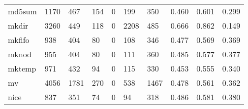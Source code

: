 \begin{longtable}{lp{2.0cm}p{2.0cm}p{2.0cm}p{2.0cm}p{2.0cm}p{2.0cm}p{2.0cm}p{2.0cm}p{2.0cm}}
md5sum    &                   1170 &                                467 &                               154 &                                0 &                               199 &                             350 &                                   0.460 &                                  0.601 &                                0.299 \\
mkdir     &                   3260 &                                449 &                               118 &                                0 &                              2208 &                             485 &                                   0.666 &                                  0.862 &                                0.149 \\
mkfifo    &                    938 &                                404 &                                80 &                                0 &                               108 &                             346 &                                   0.477 &                                  0.569 &                                0.369 \\
mknod     &                    955 &                                404 &                                80 &                                0 &                               111 &                             360 &                                   0.485 &                                  0.577 &                                0.377 \\
mktemp    &                    971 &                                432 &                                94 &                                0 &                               115 &                             330 &                                   0.453 &                                  0.555 &                                0.340 \\
mv        &                   4056 &                               1781 &                               270 &                                0 &                               538 &                            1467 &                                   0.478 &                                  0.561 &                                0.362 \\
nice      &                    837 &                                351 &                                74 &                                0 &                                94 &                             318 &                                   0.486 &                                  0.581 &                                0.380 \\

\end{longtable}
